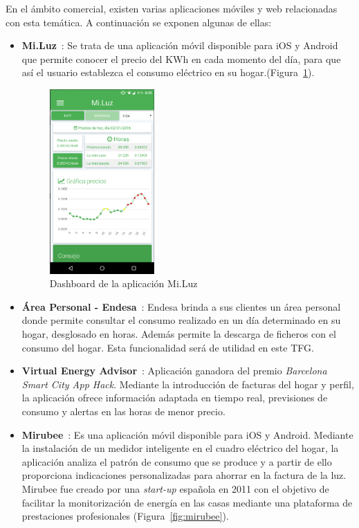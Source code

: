En el ámbito comercial, existen varias aplicaciones móviles y web relacionadas con esta temática. A continuación se exponen algunas de ellas:
\begin{itemize}
  \item \textbf{Mi.Luz}~\cite{MiLu}: Se trata de una aplicación móvil disponible para iOS y Android que permite conocer el precio del KWh en cada momento del día, para que así el usuario establezca el consumo eléctrico en su hogar.(Figura~\ref{fig:miluz}).
    \begin{figure}[!h]
	\centering
	\includegraphics[width=4cm]{figs/miluz.png}
	\caption{Dashboard de la aplicación Mi.Luz}
        \label{fig:miluz}
\end{figure}
\item \textbf{Área Personal - Endesa}~\cite{End}: Endesa brinda a sus clientes un área personal donde permite consultar el consumo realizado en un día determinado en su hogar, desglosado en horas. Además permite la descarga de ficheros con el consumo del hogar. Esta funcionalidad será de utilidad en este \gls{TFG}.
\item \textbf{Virtual Energy Advisor}~\cite{Vea}: Aplicación ganadora del premio \textit{Barcelona Smart City App Hack}. Mediante la introducción de facturas del hogar y perfil, la aplicación ofrece información adaptada en tiempo real, previsiones de consumo y alertas en las horas de menor precio.
\item \textbf{Mirubee}~\cite{MiRu}: Es una aplicación móvil disponible para iOS y Android. Mediante la instalación de un medidor inteligente en el cuadro eléctrico del hogar, la aplicación analiza el patrón de consumo que se produce y a partir de ello proporciona indicaciones personalizadas para ahorrar en la factura de la luz. Mirubee fue creado por una \textit{start-up} española en 2011 con el objetivo de facilitar la monitorización de energía en las casas mediante una plataforma de prestaciones profesionales (Figura~\ref{fig:mirubee}).

\end{itemize}
